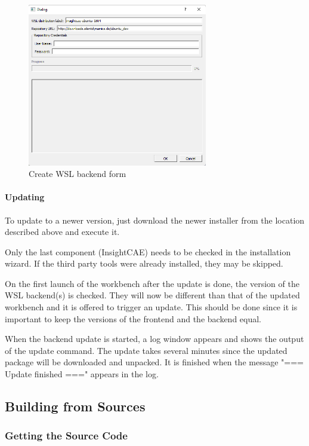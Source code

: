 \begin{figure}[ht]
\centering
\includegraphics[width=0.7\textwidth]{figs/workbench/create_wsl}
\caption{Create WSL backend form}
\label{fig:create_wsl}
\end{figure}

\paragraph{Updating}

To update to a newer version, just download the newer installer from the location described above and execute it.

Only the last component (InsightCAE) needs to be checked in the installation wizard.
If the third party tools were already installed, they may be skipped.

On the first launch of the workbench after the update is done, the version of the WSL backend(s) is checked.
They will now be different than that of the updated workbench and it is offered to trigger an update.
This should be done since it is important to keep the versions of the frontend and the backend equal.

When the backend update is started, a log window appears and shows the output of the update command.
The update takes several minutes since the updated package will be downloaded and unpacked. 
It is finished when the message "=== Update finished ===" appears in the log.

\subsection{Building from Sources}

\subsubsection{Getting the Source Code}


